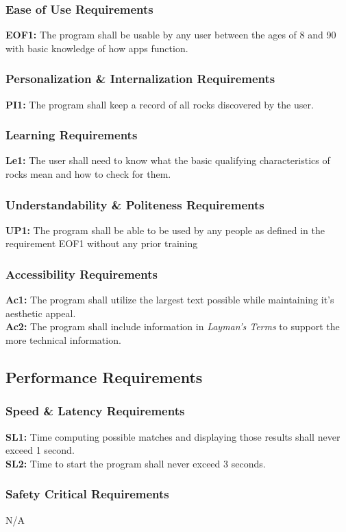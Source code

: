 \documentclass[titlepage]{article}
\begin{document}
\subsubsection{Ease of Use Requirements}
\textbf{EOF1:} The program shall be usable by any user between the ages of 8 and 90 with basic knowledge of how apps function.
\subsubsection{Personalization \& Internalization Requirements}
\textbf{PI1:} The program shall keep a record of all rocks discovered by the user.
\subsubsection{Learning Requirements}
\textbf{Le1:} The user shall need to know what the basic qualifying characteristics of rocks mean and how to check for them.
\subsubsection{Understandability \& Politeness Requirements}
\textbf{UP1:} The program shall be able to be used by any people as defined in the requirement EOF1 without any prior training
\subsubsection{Accessibility Requirements}
\textbf{Ac1:} The program shall utilize the largest text possible while maintaining it's aesthetic appeal.\\

\noindent\textbf{Ac2:} The program shall include information in \textit{Layman's Terms} to support the more technical information.

\subsection{Performance Requirements}
\subsubsection{Speed \& Latency Requirements}
\textbf{SL1:} Time computing possible matches and displaying those results shall never exceed 1 second.\\

\noindent\textbf{SL2:} Time to start the program shall never exceed 3 seconds.
\subsubsection{Safety Critical Requirements}
N/A
\end{document}
